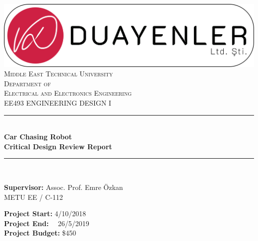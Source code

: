 \documentclass[a4paper,12pt]{article}
\begin{document}
	
	\begin{titlepage}
		
		\newcommand{\HRule}{\rule{\linewidth}{0.5mm}} %
		\centering 
		
		\includegraphics[width=\textwidth,height=\textheight,keepaspectratio]{../../documents/logos/logo3-with-stroke}\\[0.5cm]
		
		\textsc{\LARGE Middle East Technical University}\\[0.5cm] %
		\textsc{\Large Department of \\Electrical and Electronics Engineering }\\[0.5cm] %
		\textsc{\large EE493 ENGINEERING DESIGN I}\\[0.5cm] %
		
		
		\HRule \\[0cm]
		{ \huge \bfseries  Car Chasing Robot\\[0.1cm] \LARGE \bfseries Critical Design Review Report}\\[0cm] %
		\HRule \\[1cm]
		
		\begin{minipage}[l]{0.6\textwidth}
			\raggedright
			\large{\textbf{Supervisor:}}	Assoc. Prof. Emre Özkan \\
			\hspace{3.05cm}  METU EE / C-112
			
		\end{minipage}
		\begin{minipage}[r]{0.35\textwidth}
			\raggedright
			\textbf{Project Start:} 4/10/2018\\
			\textbf{Project End:} \ \  26/5/2019\\
			\textbf{Project Budget:} \$450
			

\end{minipage}
\end{titlepage}
\end{document}
